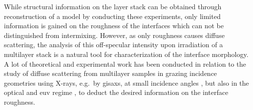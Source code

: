 While structural information on the layer stack can be obtained through reconstruction of a model by conducting these experiments, only limited information is gained on the roughness of the interfaces which can not be distinguished from intermixing. However, as only roughness causes diffuse scattering, the analysis of this off-specular intensity upon irradiation of a multilayer stack is a natural tool for characterization of the interface morphology. A lot of theoretical and experimental work has been conducted in relation to the study of diffuse scattering from multilayer samples in grazing incidence geometries using X-rays, e.g.~by \gls{gisaxs}, at small incidence angles \cite{mikulik_x-ray_1997, sinha_x-ray_1994, de_boer_x-ray_1995, de_boer_x-ray_1996, salditt_kinetic_1994, levine_grazing-incidence_1989,siffalovic_characterization_2009}, but also in the optical and \gls{euv} regime \cite{amra_light_1993, amra_light_1994, elson_light_1980, elson_relationship_1983, schroder_angle-resolved_2011, schroder_spectral_2014}, to deduct the desired information on the interface roughness.

